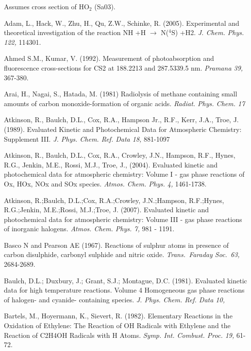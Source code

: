 \documentclass[12pt,landscape]{article}
\newcounter{reaction}
\newcounter{photo}
\begin{document}
 Assumes cross section of HO$_2$ (Sa03).

\medskip
\medskip


Adam, L., Hack, W., Zhu, H., Qu, Z.W., Schinke, R. (2005). Experimental and theoretical investigation of the reaction NH +H $\rightarrow$ N($^4$S) +H2. {\em J. Chem. Phys. 122,} 114301.

Ahmed S.M., Kumar, V. (1992). Measurement of photoabsorption and fluorescence cross-sections for CS2 at 188.2213 and 287.5339.5 nm. {\em Pramana 39,} 367-380.

 Arai, H., Nagai, S., Hatada, M. (1981) Radiolysis of methane containing small amounts of carbon monoxide-formation of organic acids.  {\em Radiat. Phys. Chem.  17}

Atkinson, R., Baulch, D.L., Cox, R.A., Hampson Jr., R.F., Kerr, J.A., Troe, J. (1989). Evaluated Kinetic and Photochemical Data for Atmospheric Chemistry: Supplement III.  {\em J. Phys. Chem. Ref. Data 18,}  881-1097

Atkinson, R., Baulch, D.L., Cox, R.A., Crowley, J.N., Hampson, R.F., Hynes, R.G., Jenkin, M.E., Rossi, M.J., Troe, J., (2004). Evaluated kinetic and photochemical data for atmospheric chemistry: Volume I - gas phase reactions of Ox, HOx, NOx and SOx species.  {\em Atmos. Chem. Phys.  4,} 1461-1738.

Atkinson, R.;Baulch, D.L.;Cox, R.A.;Crowley, J.N.;Hampson, R.F.;Hynes, R.G.;Jenkin, M.E.;Rossi, M.J.;Troe, J. (2007).  Evaluated kinetic and photochemical data for atmospheric chemistry: Volume III - gas phase reactions of inorganic halogens.
{\em Atmos. Chem. Phys. 7,} 981 - 1191.

Basco N and Pearson AE (1967). Reactions of sulphur atoms in presence of carbon disulphide, carbonyl sulphide and nitric oxide. {\em Trans.\ Faraday Soc.\ 63,} 2684-2689.

Baulch, D.L.; Duxbury, J.; Grant, S.J.; Montague, D.C. (1981).  Evaluated kinetic data for high temperature reactions. Volume 4 Homogeneous gas phase reactions of halogen- and cyanide- containing species. {\em J. Phys. Chem. Ref. Data 10,} 

Bartels, M., Hoyermann, K., Sievert, R. (1982).  Elementary Reactions in the Oxidation of Ethylene: The Reaction of OH Radicals with Ethylene and the Reaction of C2H4OH Radicals with H Atoms.  {\em Symp. Int. Combust. Proc. 19,} 61-72.
\end{document}
